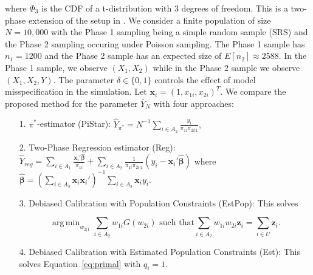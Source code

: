 \documentclass[12pt]{article}
\DeclareMathOperator*{\argmin}{arg\,min}
\renewcommand{\bf}[1]{\mathbf{#1}}
\begin{document}
where $\Phi_3$ is the CDF of a t-distribution with 3 degrees of freedom.
This is a two-phase extension of the setup in \cite{kwon2024debiased}. We
consider a finite population of size $N = 10,000$ with the Phase 1 sampling
being a simple random sample (SRS) and the 
Phase 2 sampling occuring under Poisson sampling. The Phase 1 sample has
$n_1 = 1200$ and the Phase 2 sample has an expected size of
$E[n_2] \approx 2588$. In the Phase 1 sample, we observe 
$(X_1, X_2)$ while in the Phase 2 sample we observe $(X_1, X_2, Y)$. 
The parameter $\delta \in \{0, 1\}$ controls the effect of model misspecification
in the simulation. Let $\bf x_i = (1, x_{1i}, x_{2i})^T$. We compare the
proposed method for the parameter $\bar Y_N$ with four approaches:

\begin{itemize}
  \item[1.] $\pi^*$-estimator (PiStar): $\hat Y_{\pi^*} = N^{-1} \sum_{i \in A_2}
    \frac{y_i}{\pi_{1i} \pi_{2i|1}},$
  \item[2.] Two-Phase Regression estimator (Reg): 
    $\hat Y_{reg} = \sum_{i \in A_1} \frac{\bf x_i' \widehat{\bm \beta}}{\pi_{1i}} + 
    \sum_{i \in A_2} \frac{1}{\pi_{1i}\pi_{2i|1}}(y_i - \bf x_i' \widehat{\bm \beta})$ 
    where $\widehat{\bm \beta} = 
    \left(\sum_{i \in A_2} \bf x_i \bf x_i'\right)^{-1} \sum_{i \in A_2} \bf x_i y_i$.
  \item[3.] Debiased Calibration with Population Constraints (EstPop): This 
    solves 

  \begin{equation}
    \argmin_{w_{2|1}} \sum_{i \in A_2} w_{1i} G(w_{2i}) \text{ such that}
    \sum_{i \in A_2} w_{1i} w_{2i} \bf z_i = \sum_{i \in U} \bf z_i.
  \end{equation}

  \item[4.] Debiased Calibration with Estimated Population Constraints (Est):
    This solves Equation~\eqref{eq:primal} with $q_i = 1$.
\end{itemize}
\end{document}
